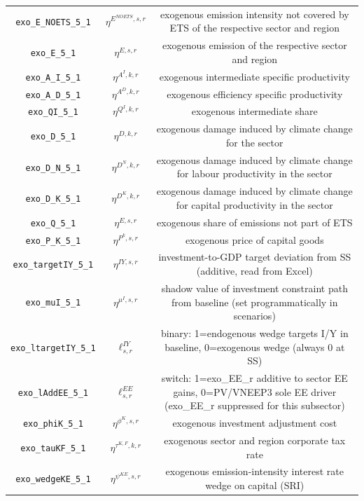 \begin{center}
\begin{longtable}{ccc}
\texttt{exo\_E\_NOETS\_5\_1} & ${\eta^{E^{NOETS},s,r}}$ & exogenous emission intensity not covered by ETS of the respective sector and region\\
\texttt{exo\_E\_5\_1} & ${\eta^{E,s,r}}$ & exogenous emission of the respective sector and region\\
\texttt{exo\_A\_I\_5\_1} & ${\eta^{A^{I},k,r}}$ & exogenous intermediate specific productivity\\
\texttt{exo\_A\_D\_5\_1} & ${\eta^{A^{D},k,r}}$ & exogenous efficiency specific productivity\\
\texttt{exo\_QI\_5\_1} & ${\eta^{Q^{I},k,r}}$ & exogenous intermediate share\\
\texttt{exo\_D\_5\_1} & ${\eta^{D,k,r}}$ & exogenous damage induced by climate change for the sector\\
\texttt{exo\_D\_N\_5\_1} & ${\eta^{D^{N},k,r}}$ & exogenous damage induced by climate change for labour productivity in the sector\\
\texttt{exo\_D\_K\_5\_1} & ${\eta^{D^{K},k,r}}$ & exogenous damage induced by climate change for capital productivity in the sector\\
\texttt{exo\_Q\_5\_1} & ${\eta^{E,s,r}}$ & exogenous share of emissions not part of ETS\\
\texttt{exo\_P\_K\_5\_1} & ${\eta^{P^k,s,r}}$ & exogenous price of capital goods\\
\texttt{exo\_targetIY\_5\_1} & ${\eta^{IY,s,r}}$ & investment-to-GDP target deviation from SS (additive, read from Excel)\\
\texttt{exo\_muI\_5\_1} & ${\eta^{\mu^{I},s,r}}$ & shadow value of investment constraint path from baseline (set programmatically in scenarios)\\
\texttt{exo\_ltargetIY\_5\_1} & ${\ell^{IY}_{s,r}}$ & binary: 1=endogenous wedge targets I/Y in baseline, 0=exogenous wedge (always 0 at SS)\\
\texttt{exo\_lAddEE\_5\_1} & ${\ell^{EE}_{s,r}}$ & switch: 1=exo\_EE\_r additive to sector EE gains, 0=PV/VNEEP3 sole EE driver (exo\_EE\_r suppressed for this subsector)\\
\texttt{exo\_phiK\_5\_1} & ${\eta^{\phi^{K},{s,r}}}$ & exogenous investment adjustment cost\\
\texttt{exo\_tauKF\_5\_1} & ${\eta^{\tau^{K,F},k,r}}$ & exogenous sector and region corporate tax rate\\
\texttt{exo\_wedgeKE\_5\_1} & ${\eta^{\psi^{KE},s,r}}$ & exogenous emission-intensity interest rate wedge on capital (SRI)\\

\end{longtable}
\end{center}
